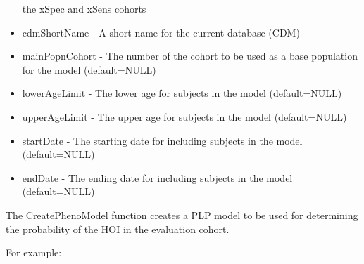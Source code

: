 \documentclass[]{article}
\begin{document}
\begin{itemize}
  the xSpec and xSens cohorts
\item
  cdmShortName - A short name for the current database (CDM)
\item
  mainPopnCohort - The number of the cohort to be used as a base
  population for the model (default=NULL)
\item
  lowerAgeLimit - The lower age for subjects in the model (default=NULL)
\item
  upperAgeLimit - The upper age for subjects in the model (default=NULL)
\item
  startDate - The starting date for including subjects in the model
  (default=NULL)
\item
  endDate - The ending date for including subjects in the model
  (default=NULL)
\end{itemize}

The CreatePhenoModel function creates a PLP model to be used for
determining the probability of the HOI in the evaluation cohort.

For example:
\end{document}
